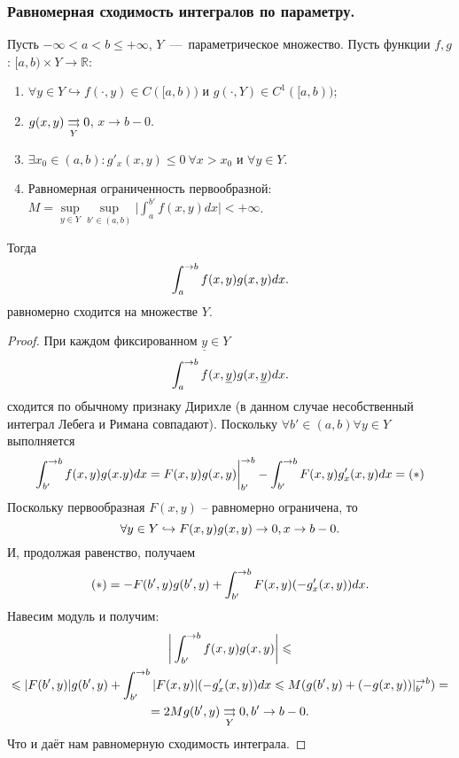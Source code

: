 \subsubsection{Равномерная сходимость интегралов по параметру.}
\begin{theorem}
    Пусть $-\infty <  a <  b \leq + \infty$, $Y$~---~параметрическое множество.
    Пусть функции $f, g$: $[a, b) \times Y \to \mathbb{R}$:
    \begin{enumerate}
        \item $\forall y \in Y \hookrightarrow f(\cdot, y) \in C([a, b))$ и $g(\cdot, Y) \in C^1([a, b))$;
        \item $g(x, y) \underset{Y}{\rightrightarrows} 0$, $x \rightarrow b - 0$.
        \item $\exists x_0 \in (a, b): g'_x(x, y) \leq 0\  \forall x > x_0$ и $\forall y \in Y$.
        \item Равномерная ограниченность первообразной: $\displaystyle M = \sup\limits_{y \in Y} \sup\limits_{b' \in (a, b)} \biggr|\int_a^{b'}f(x, y)dx\biggr| < +\infty$.
    \end{enumerate}
    Тогда \[
              \int_a^{\rightarrow b} f(x, y)g(x, y)dx.
    \]
    равномерно сходится на множестве $Y$.
\end{theorem}
\begin{proof}
    При каждом фиксированном $\underline{y} \in Y$
    \[
        \int_a^{\rightarrow b}f(x, \underline{y})g(x, \underline{y})dx.
    \]
    сходится по обычному признаку Дирихле (в данном случае несобственный интеграл Лебега и Римана совпадают).
    Поскольку $\forall b' \in (a, b) \forall y \in Y$ выполняется
    \[
        \int_{b'}^{\rightarrow b} f(x, y)g(x. y)dx = F(x, y)g(x, y)\biggr|_{b'}^{\rightarrow b} - \int_{b'}^{\rightarrow b}F(x, y)g'_x(x, y)dx = (*)
    \]
    Поскольку первообразная $F(x, y)$ -- равномерно ограничена, то
    \[
        \forall y \in Y \hookrightarrow F(x, y)g(x, y) \rightarrow 0, x \rightarrow b - 0.
    \]
    И, продолжая равенство, получаем
    \[
        (*) = -F(b', y)g(b', y) + \int_{b'}^{\rightarrow b} F(x, y)(-g'_x(x, y))dx.
    \]
    Навесим модуль и получим:
    \begin{multline*}
        \biggr|\int_{b'}^{\rightarrow b} f(x, y)g(x, y) \biggr| \leqslant \\ \leqslant
        |F(b', y)|g(b', y) + \int_{b'}^{\rightarrow b}  |F(x, y)|(-g'_x(x, y))dx \leqslant M(g(b', y) + (-g(x, y))|^{\rightarrow b}_{b'}) = \\ = 2M g(b', y) \underset{Y}{\rightrightarrows} 0, b' \rightarrow b - 0.
    \end{multline*}
    Что и даёт нам равномерную сходимость интеграла.
\end{proof}

